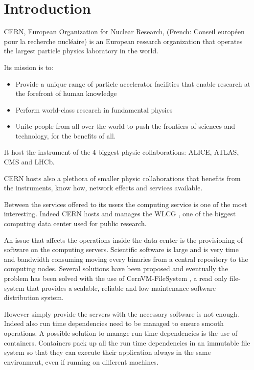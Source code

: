 \chapter{Introduction}\label{ch:introduction}

CERN, European Organization for Nuclear Research, (French: Conseil européen
pour la recherche nucléaire) is an European research organization that operates
the largest particle physics laboratory in the world.

Its mission is to:
\begin{itemize}
	\item Provide a unique range of particle accelerator facilities that enable research at the forefront of human knowledge
	\item Perform world-class research in fundamental physics
	\item Unite people from all over the world to push the frontiers of sciences and technology, for the benefits of all.
\end{itemize}

It host the instrument of the 4 biggest physic collaborations: ALICE, ATLAS,
CMS and LHCb.

CERN hosts also a plethora of smaller physic collaborations that benefits from
the instruments, know how, network effects and services available.

Between the services offered to its users the computing service is one of the
most interesting. Indeed CERN hosts and manages the WLCG \cite{grid:website}, one
of the biggest computing data center used for public research.

An issue that affects the operations inside the data center is the provisioning
of software on the computing servers. Scientific software is large and is very
time and bandwidth consuming moving every binaries from a central repository to
the computing nodes.  Several solutions have been proposed and eventually the
problem has been solved with the use of CernVM-FileSystem \cite{cvmfs}, a read
only file-system that provides a scalable, reliable and low maintenance
software distribution system.

However simply provide the servers with the necessary software is not enough.
Indeed also run time dependencies need to be managed to ensure smooth
operations. A possible solution to manage run time dependencies is the use of
containers. Containers pack up all the run time dependencies in an immutable
file system so that they can execute their application always in the same
environment, even if running on different machines. 

